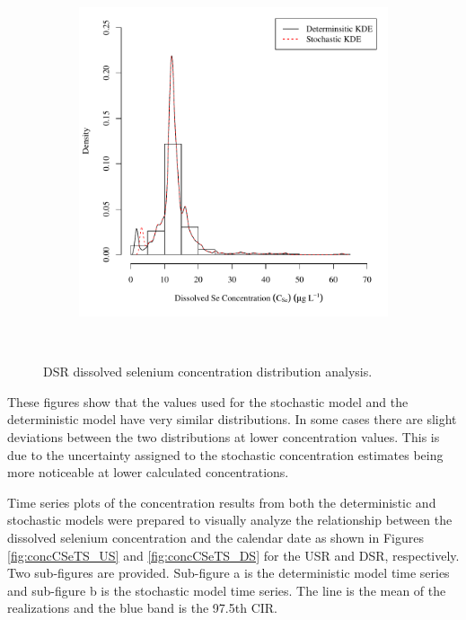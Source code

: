 \subfiguremid
\begin{landscape}
	\begin{figure}
		\begin{subfigure}{0.7\textwidth}
			\centering
			\includegraphics[width=\tableCustomSize]{"Figures/Results_DSR/Stochastic/c d&s est WIL"}
		\end{subfigure}\\
		\caption{DSR dissolved selenium concentration distribution analysis.}
	\end{figure}
\end{landscape}
\subfiguretop

These figures show that the values used for the stochastic model and the deterministic model have very similar distributions.  In some cases there are slight deviations between the two distributions at lower concentration values.  This is due to the uncertainty assigned to the stochastic concentration estimates being more noticeable at lower calculated concentrations.

Time series plots of the concentration results from both the deterministic and stochastic models were prepared to visually analyze the relationship between the dissolved selenium concentration and the calendar date as shown in Figures \ref{fig:concCSeTS_US} and \ref{fig:concCSeTS_DS} for the USR and DSR, respectively.  Two sub-figures are provided.  Sub-figure a is the deterministic model time series and sub-figure b is the stochastic model time series.  The line is the mean of the realizations and the blue band is the 97.5th CIR.

